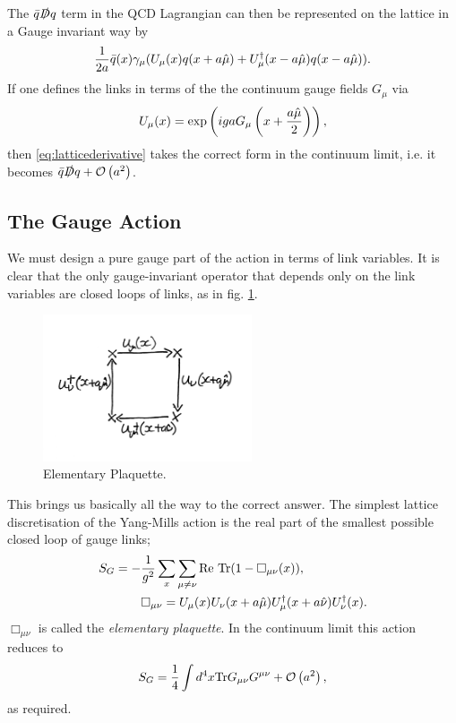 The $\bar{q}\slashed{D}q$ term in the QCD Lagrangian can then be represented on the lattice in a Gauge invariant way by
\begin{align}
  {1\over 2a}\bar{q}(x) \gamma_{\mu}(U_{\mu}(x)q(x+a\hat{\mu}) + U^{\dagger}_{\mu}(x-a\hat{\mu})q(x-a\hat{\mu}) ).
  \label{eq:latticederivative}
\end{align}
If one defines the links in terms of the the continuum gauge fields $G_{\mu}$ via
\begin{align}
  U_{\mu}(x) = \exp\left( iga G_{\mu}\left(x+{a\hat{\mu}\over2}\right) \right),
\end{align}
then \eqref{eq:latticederivative} takes the correct form in the continuum limit, i.e. it becomes $\bar{q}\slashed{D}q + \mathcal{O}\left( a^2 \right)$.

\subsection{The Gauge Action}

We must design a pure gauge part of the action in terms of link variables. It is clear that the only gauge-invariant operator that depends only on the link variables are closed loops of links, as in fig. \ref{fig:plaquette}.

\begin{figure}
  \begin{center}
    \vspace{-10pt}
    \includegraphics[width=0.55\textwidth]{images/plaquette.jpg}
    \caption{Elementary Plaquette. \label{fig:plaquette}}
    \vspace{-20pt}
  \end{center}
\end{figure}

This brings us basically all the way to the correct answer. The simplest lattice discretisation of the Yang-Mills action is the real part of the smallest possible closed loop of gauge links;
\begin{align}
  S_G = - &{1\over g^2} \sum_x \sum_{\mu\neq \nu} \text{Re Tr} (1-\Box_{\mu\nu}(x)), \\
  &\Box_{\mu\nu} = U_{\mu}(x)U_{\nu}(x+a\hat{\mu}) U^{\dagger}_{\mu}(x+a\hat{\nu}) U^{\dagger}_{\nu}(x).
  \label{eq:wilson_gauge_action}
\end{align}
$\Box_{\mu\nu}$ is called the {\it{elementary plaquette}}. In the continuum limit this action reduces to
\begin{align}
  S_G = {1\over 4} \int d^4x \text{Tr}G_{\mu\nu}G^{\mu\nu} + \mathcal{O}\left( a^2 \right),
\end{align}
as required.

